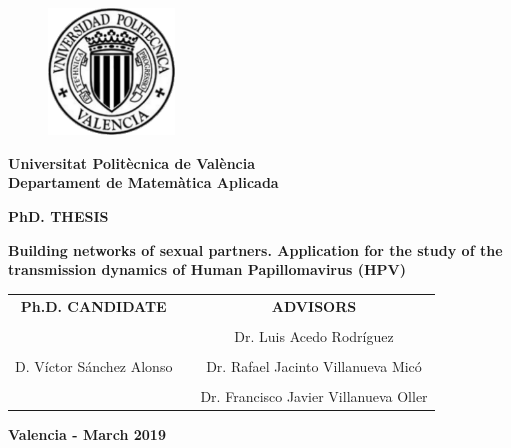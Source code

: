 \thispagestyle{empty}

\begin{figure}[h]
  	\centering
  	 \includegraphics[width=0.3\textwidth]{IMG/escudo_upv_transp.pdf}
\end{figure}
\begin{center}
\textbf{\normalsize Universitat Polit\`{e}cnica de Val\`{e}ncia}\\
\textbf{\normalsize Departament de Matem\`{a}tica Aplicada}

\vspace{1cm}

\scriptsize{\textbf{PhD. THESIS}}

\vspace{0.5cm}

\begin{center}
\textbf{\Huge Building networks of sexual partners. Application for the study of the transmission dynamics of Human Papillomavirus (HPV)}
\end{center}

\vspace{3cm}

\begin{tabular}{ccc}
\textbf{Ph.D. CANDIDATE} 				& \hspace{0.7cm} &\textbf{ADVISORS} \\
 										& \hspace{0.7cm} &\\
 										& \hspace{0.7cm} &\normalsize{Dr. Luis Acedo Rodr\'{i}guez \hfill} \\
										& \hspace{0.7cm} &\\
\normalsize{D. V\'{i}ctor S\'{a}nchez Alonso} 	& \hspace{0.7cm} & \normalsize{Dr. Rafael Jacinto Villanueva Mic\'{o} \hfill } \\ 
										& \hspace{0.7cm} &\\
 										& \hspace{0.7cm} & \normalsize{Dr. Francisco Javier Villanueva Oller \hfill} \\ 
\end{tabular} 

\vspace{2cm}

\normalsize{\textbf{Valencia - March 2019}}

\end{center}
